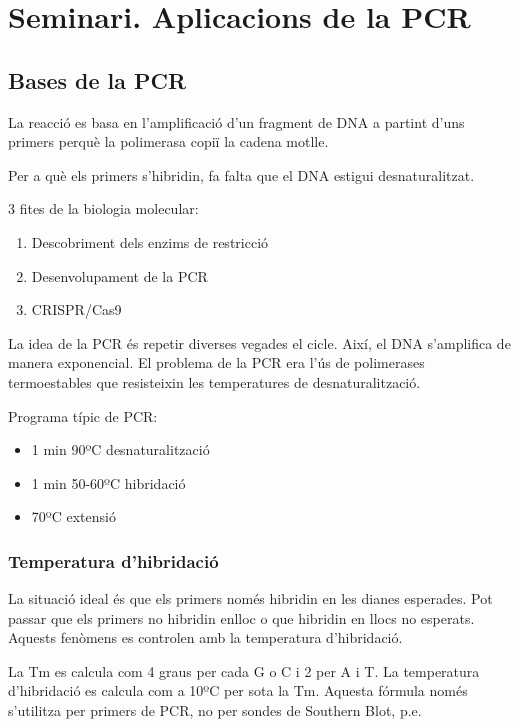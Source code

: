 \section{Seminari. Aplicacions de la PCR}

\subsection{Bases de la PCR}
La reacció es basa en l'amplificació d'un fragment de DNA a partint d'uns primers perquè la polimerasa copiï la cadena motlle.

Per a què els primers s'hibridin, fa falta que el DNA estigui desnaturalitzat.

3 fites de la biologia molecular:
\begin{enumerate}
\item Descobriment dels enzims de restricció
\item Desenvolupament de la PCR
\item CRISPR/Cas9
\end{enumerate}

La idea de la PCR és repetir diverses vegades el cicle. Així, el DNA s'amplifica de manera exponencial. El problema de la PCR era l'ús de polimerases termoestables que resisteixin les temperatures de desnaturalització.

Programa típic de PCR:
\begin{itemize}
\item 1 min 90ºC desnaturalització
\item 1 min 50-60ºC hibridació
\item 70ºC extensió
\end{itemize}

\subsubsection{Temperatura d'hibridació}
La situació ideal és que els primers només hibridin en les dianes esperades. Pot passar que els primers no hibridin enlloc o que hibridin en llocs no esperats. Aquests fenòmens es controlen amb la temperatura d'hibridació.

La Tm es calcula com 4 graus per cada G o C i 2 per A i T. La temperatura d'hibridació es calcula com a 10ºC per sota la Tm. Aquesta fórmula només s'utilitza per primers de PCR, no per sondes de Southern Blot, p.e.

